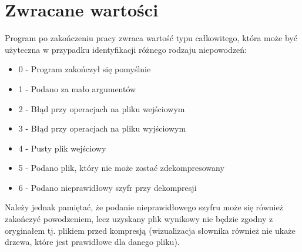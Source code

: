 \documentclass[]{article}
\begin{document}
\section{Zwracane wartości}\label{header-n281}

Program po zakończeniu pracy zwraca wartość typu całkowitego, która może być użyteczna w przypadku identyfikacji różnego rodzaju niepowodzeń:

\begin{itemize}
\item
0 - Program zakończył się pomyślnie
\item
1 - Podano za mało argumentów
\item
2 - Błąd przy operacjach na pliku wejściowym
\item
3 - Błąd przy operacjach na pliku wyjściowym
\item
4 - Pusty plik wejściowy
\item
5 - Podano plik, który nie może zostać zdekompresowany
\item
6 - Podano nieprawidłowy szyfr przy dekompresji
\end{itemize}
Należy jednak pamiętać, że podanie nieprawidłowego szyfru może się również zakończyć powodzeniem, lecz uzyskany plik wynikowy nie będzie zgodny z oryginałem tj. plikiem przed kompresją (wizualizacja słownika również nie ukaże drzewa, które jest prawidłowe dla danego pliku).
\end{document}
